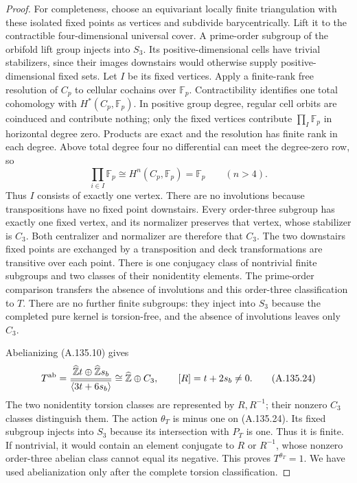 \begin{proof}
For completeness, choose an equivariant locally finite
triangulation with these isolated fixed points as vertices and
subdivide barycentrically. Lift it to the contractible
four-dimensional universal cover. A prime-order subgroup of the
orbifold lift group injects into \(S_3\). Its positive-dimensional
cells have trivial stabilizers, since their images downstairs
would otherwise supply positive-dimensional fixed sets. Let
\(I\) be its fixed vertices. Apply a finite-rank free resolution
of \(C_p\) to cellular cochains over \(\mathbb F_p\).
Contractibility identifies one total cohomology with
\(H^*(C_p,\mathbb F_p)\). In positive group degree, regular
cell orbits are coinduced and contribute nothing; only the
fixed vertices contribute \(\prod_I\mathbb F_p\) in horizontal
degree zero. Products are exact and the resolution has finite
rank in each degree. Above total degree four no differential
can meet the degree-zero row, so
\[
           \prod_{i\in I}\mathbb F_p
                    \cong H^n(C_p,\mathbb F_p)=\mathbb F_p
                    \qquad(n>4).
 \tag{A.135.23}
\]
Thus \(I\) consists of exactly one vertex. There are no
involutions because transpositions have no fixed point
downstairs. Every order-three subgroup has exactly one fixed
vertex, and its normalizer preserves that vertex, whose
stabilizer is \(C_3\). Both centralizer and normalizer are
therefore that \(C_3\). The two downstairs fixed points are
exchanged by a transposition and deck transformations are
transitive over each point. There is one conjugacy class of
nontrivial finite subgroups and two classes of their nonidentity
elements. The prime-order comparison transfers the absence of
involutions and this order-three classification to \(T\).
There are no further finite subgroups: they inject into \(S_3\)
because the completed pure kernel is torsion-free, and the
absence of involutions leaves only \(C_3\).

Abelianizing (A.135.10) gives
\[
 T^{\rm ab}
 =\frac{\widehat{\mathbb Z}t\oplus\widehat{\mathbb Z}s_b}
        {\overline{\langle3t+6s_b\rangle}}
 \cong\widehat{\mathbb Z}\oplus C_3,
 \qquad [R]=t+2s_b\ne0.
 \tag{A.135.24}
\]
The two nonidentity torsion classes are represented by
\(R,R^{-1}\); their nonzero \(C_3\) classes distinguish them.
The action \(\theta_T\) is minus one on (A.135.24).
Its fixed subgroup injects into \(S_3\) because its intersection
with \(P_T\) is one. Thus it is finite. If nontrivial, it would
contain an element conjugate to \(R\) or \(R^{-1}\), whose
nonzero order-three abelian class cannot equal its negative.
This proves \(T^{\theta_T}=1\). We have used abelianization only
after the complete torsion classification.


\end{proof}

